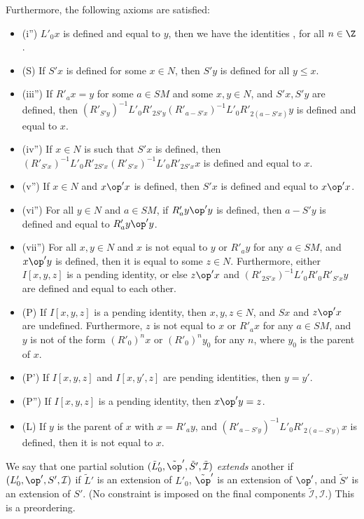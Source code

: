 \begin{definition}
Furthermore, the following axioms are satisfied:
\begin{itemize}
  \item (i'')  $L'_0 x$ is defined and equal to $y$, then we have the identities ,  for all $n\in \Z$.
  \item (S) If $S'x$ is defined for some $x \in N$, then $S'y$ is defined for all $y \leq x$.
  \item (iii'') If $R'_a x = y$ for some $a \in SM$ and some $x,y \in N$, and $S'x, S'y$ are defined, then $(R'_{S'y})^{-1} L'_0 R'_{2S'y} (R'_{a-S'x})^{-1} L'_0 R'_{2(a-S'x)} y$ is defined and equal to $x$.
  \item (iv'') If $x \in N$ is such that $S'x$ is defined, then $(R'_{S'x})^{-1} L'_0 R'_{2S'x} (R'_{S'x})^{-1} L'_0 R'_{2S'x} x$ is defined and equal to $x$.
  \item (v'')  If $x \in N$ and $x \op' x$ is defined, then $S'x$ is defined and equal to $x \op' x$.
  \item (vi'')  For all $y \in N$ and $a \in SM$, if $R'_a y \op' y$ is defined, then $a - S'y$ is defined and equal to $R'_a y \op' y$.
  \item (vii'')  For all $x,y \in N$ and $x$ is not equal to $y$ or $R'_a y$ for any $a \in SM$, and $x \op' y$ is defined, then it is equal to some $z \in N$.  Furthermore, either $I[x,y,z]$ is a pending identity, or else $z \op' x$ and $(R'_{2S'x})^{-1} L'_0 R'_0 R'_{S'x} y$ are defined and equal to each other.
  \item (P) If $I[x,y,z]$ is a pending identity, then $x,y,z \in N$, and $Sx$ and $z \op' x$ are undefined.  Furthermore, $z$ is not equal to $x$ or $R'_a x$ for any $a \in SM$, and $y$ is not of the form $(R'_0)^n x$ or $(R'_0)^n y_0$ for any $n$, where $y_0$ is the parent of $x$.
  \item (P') If $I[x,y,z]$ and $I[x,y',z]$ are pending identities, then $y=y'$.
  \item (P'') If $I[x,y,z]$ is a pending identity, then $x \op' y = z$.
  \item (L) If $y$ is the parent of $x$ with $x = R'_a y$, and $(R'_{a-S'y})^{-1} L'_0 R'_{2(a-S'y)} x$ is defined, then it is not equal to $x$.
\end{itemize}

We say that one partial solution $(\tilde L'_0, \tilde \op', \tilde S', \tilde {\mathcal I})$ \emph{extends} another if $(L'_0, \op', S',  {\mathcal I})$ if $\tilde L'$ is an extension of $L'_0$, $\tilde \op'$ is an extension of $\op'$, and $\tilde S'$ is an extension of $S'$.  (No constraint is imposed on the final components $\tilde {\mathcal I}, {\mathcal I}$.)  This is a preordering.
\end{definition}

